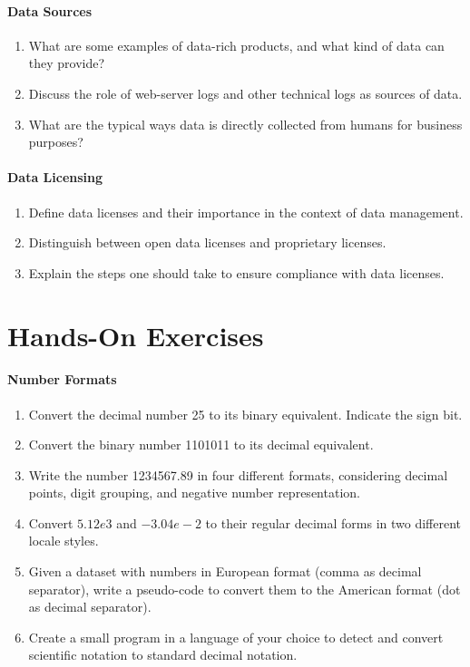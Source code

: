 \paragraph*{Data Sources}
\begin{enumerate}
	\item What are some examples of data-rich products, and what kind of data can they provide?
	\item Discuss the role of web-server logs and other technical logs as sources of data.
	\item What are the typical ways data is directly collected from humans for business purposes?
\end{enumerate}
\paragraph*{Data Licensing}
\begin{enumerate}
	\item Define data licenses and their importance in the context of data management.
	\item Distinguish between open data licenses and proprietary licenses.
	\item Explain the steps one should take to ensure compliance with data licenses.
\end{enumerate}

\section{Hands-On Exercises}

\paragraph*{Number Formats}
\begin{enumerate}[nosep]
	\item Convert the decimal number 25 to its binary equivalent. Indicate the sign bit.
	\item Convert the binary number 1101011 to its decimal equivalent.
	\item Write the number 1234567.89 in four different formats, considering decimal points, digit grouping, and negative number representation.
	\item Convert $5.12e3$ and $-3.04e-2$ to their regular decimal forms in two different locale styles.
	\item Given a dataset with numbers in European format (comma as decimal separator), write a pseudo-code to convert them to the American format (dot as decimal separator).
	\item Create a small program in a language of your choice to detect and convert scientific notation to standard decimal notation.
\end{enumerate}
